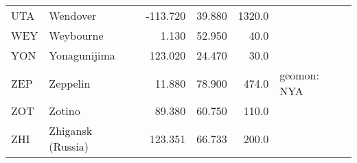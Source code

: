 \begin{table*}[!th]
\begin{tabular}{llrrrl}
UTA & Wendover                    &   -113.720 &  39.880 &  1320.0 &\\
WEY & Weybourne                   &      1.130 &  52.950 &    40.0 &\\
YON & Yonagunijima                &    123.020 &  24.470 &    30.0 &\\
ZEP & Zeppelin                    &     11.880 &  78.900 &   474.0 &geomon: NYA\\
ZOT & Zotino                      &     89.380 &  60.750 &   110.0 &\\
ZHI & Zhigansk (Russia)           &    123.351 &  66.733 &   200.0 &\\
\hline
  \end{tabular}
\end{table*}
